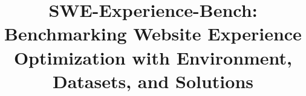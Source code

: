 \documentclass[sigconf,anonymous,review]{acmart}
\begin{document}
\title{SWE-Experience-Bench: Benchmarking Website Experience Optimization with Environment, Datasets, and Solutions}









\end{document}
